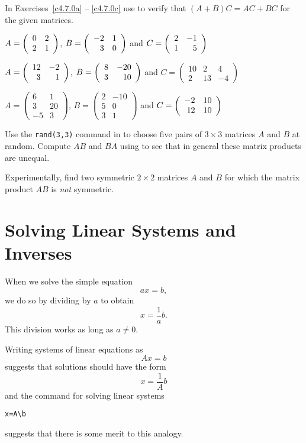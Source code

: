 \noindent In Exercises~\ref{c4.7.0a} -- \ref{c4.7.0c} use \Matlab to
verify that $(A+B)C = AC+BC$ for the given matrices.
\begin{exercise}  \label{c4.7.0a}
$A=\left(\begin{array}{rr} 0 & 2\\ 2 &1\end{array}\right)$, $B=\left(\begin{array}{rr} -2 & 1\\ 3 &0\end{array}\right)$ and $C=\left(\begin{array}{rr} 2 & -1\\ 1 &5\end{array}\right)$
\end{exercise}
\begin{exercise}  \label{c4.7.0b}
$A=\left(\begin{array}{rr} 12 & -2\\ 3 &1\end{array}\right)$,
$B=\left(\begin{array}{rr} 8 & -20\\ 3 &10\end{array}\right)$ and
$C=\left(\begin{array}{rrr} 10 & 2 & 4\\ 2 & 13 & -4 \end{array}\right)$
\end{exercise}
\begin{exercise}  \label{c4.7.0c}
$A=\left(\begin{array}{rr} 6 & 1 \\ 3 & 20 \\ -5 & 3\end{array}\right)$,
$B=\left(\begin{array}{rr} 2 & -10 \\ 5 & 0 \\ 3 & 1\end{array}\right)$ and
$C=\left(\begin{array}{rr} -2 & 10\\ 12 &10\end{array}\right)$
\end{exercise}

\begin{exercise} \label{c4.7.2}
Use the {\tt rand(3,3)} command in \Matlab to choose five pairs of
$3\times 3$ matrices $A$ and $B$ at random.  Compute $AB$ and $BA$
using \Matlab to see that in general these matrix products are unequal.
\end{exercise}

\begin{exercise} \label{c4.7.2.1}
Experimentally, find two symmetric $2\times 2$ matrices $A$ and $B$ for
which the matrix product $AB$ is {\em not\/} symmetric.
\end{exercise}



\section{Solving Linear Systems and Inverses} \label{S:SLS}

When we solve the simple equation
\[
ax=b,
\]
we do so by dividing by $a$ to obtain
\[
x=\frac{1}{a}b.
\]
This division works as long as $a\neq 0$.

Writing systems of linear equations as
\[
Ax=b
\]
suggests that solutions should have the form
\[
x=\frac{1}{A} b
\]
and the \Matlab command for solving linear systems
\begin{verbatim}
x=A\b
\end{verbatim}
suggests that there is some merit to this analogy.

